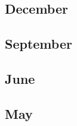 \documentclass[12pt]{article}
\begin{document}
\subsection{December}
\begin{refsection}
    \nocite{qwen_qwen25_2025}
    \printbibliography[heading=none]
\end{refsection}

\subsection{September}
\begin{refsection}
    \nocite{muennighoff_olmoe_2025}
    \printbibliography[heading=none]
\end{refsection}

\subsection{June}
\begin{refsection}
    \nocite{penedo_fineweb_2024}
    \printbibliography[heading=none]
\end{refsection}


\subsection{May}
\begin{refsection}
    \nocite{grattafiori2024llama3herdmodels}
    \nocite{gu_mamba_2024}
    \printbibliography[heading=none]
\end{refsection}



\end{document}
